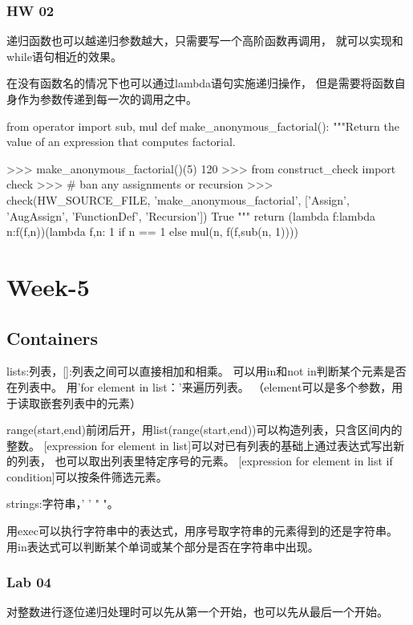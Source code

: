 \documentclass{ctexart}
\begin{document}
\subsubsection{HW 02}

递归函数也可以越递归参数越大，只需要写一个高阶函数再调用，
就可以实现和while语句相近的效果。

在没有函数名的情况下也可以通过lambda语句实施递归操作，
但是需要将函数自身作为参数传递到每一次的调用之中。
\begin{python}
    from operator import sub, mul
    def make_anonymous_factorial():
    """Return the value of an expression that computes factorial.

    >>> make_anonymous_factorial()(5)
    120
    >>> from construct_check import check
    >>> # ban any assignments or recursion
    >>> check(HW_SOURCE_FILE, 'make_anonymous_factorial', ['Assign', 'AugAssign', 'FunctionDef', 'Recursion'])
    True
    """
    return (lambda f:lambda n:f(f,n))(lambda f,n: 1 if n == 1 else mul(n, f(f,sub(n, 1))))
\end{python}

\section{Week-5}

\subsection{Containers}

lists:列表，[]:列表之间可以直接相加和相乘。
可以用in和not in判断某个元素是否在列表中。
用'for element in list：'来遍历列表。
（element可以是多个参数，用于读取嵌套列表中的元素）

range(start,end)前闭后开，用list(range(start,end))可以构造列表，只含区间内的整数。
[expression for element in list]可以对已有列表的基础上通过表达式写出新的列表，
也可以取出列表里特定序号的元素。
[expression for element in list if condition]可以按条件筛选元素。

strings:字符串，' ' " "。

用exec可以执行字符串中的表达式，用序号取字符串的元素得到的还是字符串。
用in表达式可以判断某个单词或某个部分是否在字符串中出现。

\subsubsection{Lab 04}

对整数进行逐位递归处理时可以先从第一个开始，也可以先从最后一个开始。
\end{document}
